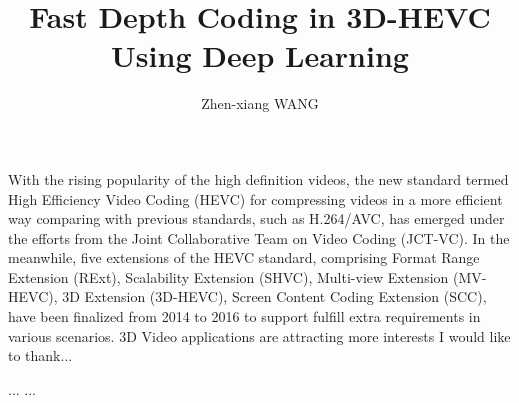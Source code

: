 \documentclass{report}
\begin{document}
    \title{Fast Depth Coding in 3D-HEVC\\
    Using Deep Learning}
    \author{Zhen-xiang WANG}
    \beforepreface
    With the rising popularity of the high definition videos, the new standard
    termed High Efficiency Video Coding (HEVC) for compressing videos in a more
    efficient way comparing with previous standards, such as H.264/AVC, has
    emerged under the efforts from the Joint Collaborative Team on Video
    Coding (JCT-VC).
    In the meanwhile, five extensions of the HEVC standard, comprising
    Format Range Extension (RExt), Scalability Extension (SHVC),
    Multi-view Extension (MV-HEVC), 3D Extension (3D-HEVC),
    Screen Content Coding Extension (SCC),  have been finalized
    from 2014 to 2016 to support fulfill extra requirements in various
    scenarios.
    3D Video applications are attracting more interests
    I would like to thank...
    \afterpreface

    
    ...
    ...
    \printbibliography[heading=bibintoc]
\end{document}
